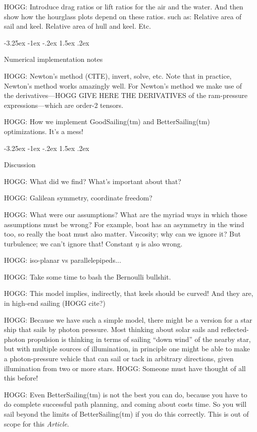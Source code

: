 \documentclass[letterpaper]{article}
\makeatletter
\newcommand{\documentname}{\textsl{Article}}
\renewcommand\section{\@startsection {section}{1}{\z@}%
  {-3.25ex \@plus -1ex \@minus -.2ex}%
  {1.5ex \@plus .2ex}%
  {\raggedright\normalfont\large\bfseries}}
\makeatother
\begin{document}
HOGG: Introduce drag ratios or lift ratios for the air and the water. And then show how the hourglass plots depend on these ratios. such as: Relative area of sail and keel. Relative area of hull and keel. Etc.

\section{Numerical implementation notes}\label{sec:implementation}

HOGG: Newton's method (CITE), invert, solve, etc.
Note that in practice, Newton's method works amazingly well.
For Newton's method we make use of the derivatives---HOGG GIVE HERE THE DERIVATIVES of the ram-pressure expressions---which are order-2 tensors.

HOGG: How we implement GoodSailing(tm) and BetterSailing(tm) optimizations. It's a mess!

\section{Discussion}\label{sec:discussion}

HOGG: What did we find? What's important about that?

HOGG: Galilean symmetry, coordinate freedom?

HOGG: What were our assumptions? What are the myriad ways in which those assumptions must be wrong? For example, boat has an asymmetry in the wind too, so really the boat must also matter. Viscosity; why can we ignore it? But turbulence; we can't ignore that! Constant $\eta$ is also wrong.

HOGG: iso-planar vs parallelepipeds...

HOGG: Take some time to bash the Bernoulli bullshit.

HOGG: This model implies, indirectly, that keels should be curved! And they are, in high-end sailing (HOGG cite?)

HOGG: Because we have such a simple model, there might be a version for a star ship that sails by photon pressure.
Most thinking about solar sails and reflected-photon propulsion is thinking in terms of sailing ``down wind'' of the nearby star, but with multiple sources of illumination, in principle one might be able to make a photon-pressure vehicle that can sail or tack in arbitrary directions, given illumination from two or more stars.
HOGG: Someone must have thought of all this before!

HOGG: Even BetterSailing(tm) is not the best you can do, because you have to do complete successful path planning, and coming about costs time. So you will sail beyond the limits of BetterSailing(tm) if you do this correctly. This is out of scope for this \documentname.
\end{document}
